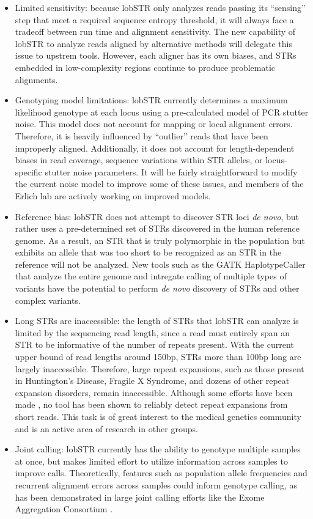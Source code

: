 \begin{itemize}
\item Limited sensitivity: because lobSTR only analyzes reads passing its ``sensing'' step that meet a required sequence entropy threshold, it will always face a tradeoff between run time and alignment sensitivity. The new capability of lobSTR to analyze reads aligned by alternative methods will delegate this issue to upstrem tools. However, each aligner has its own biases, and STRs embedded in low-complexity regions continue to produce problematic alignments.
\item Genotyping model limitations: lobSTR currently determines a maximum likelihood genotype at each locus using a pre-calculated model of PCR stutter noise. This model does not account for mapping or local alignment errors. Therefore, it is heavily influenced by ``outlier'' reads that have been improperly aligned. Additionally, it does not account for length-dependent biases in read coverage, sequence variations within STR alleles, or locus-specific stutter noise parameters. It will be fairly straightforward to modify the current noise model to improve some of these issues, and members of the Erlich lab are actively working on improved models.
\item Reference bias: lobSTR does not attempt to discover STR loci \emph{de novo}, but rather uses a pre-determined set of STRs discovered in the human reference genome. As a result, an STR that is truly polymorphic in the population but exhibits an allele that was too short to be recognized as an STR in the reference will not be analyzed. New tools such as the GATK HaplotypeCaller that analyze the entire genome and intregate calling of multiple types of variants have the potential to perform \emph{de novo} discovery of STRs and other complex variants.
\item Long STRs are inaccessible: the length of STRs that lobSTR can analyze is limited by the sequencing read length, since a read must entirely span an STR to be informative of the number of repeats present. With the current upper bound of read lengths around 150bp, STRs more than 100bp long are largely inaccessible. Therefore, large repeat expansions, such as those present in Huntington's Disease, Fragile X Syndrome, and dozens of other repeat expansion disorders, remain inaccessible. Although some efforts have been made \cite{DoiMonjoHoangEtAl2013}, no tool has been shown to reliably detect repeat expansions from short reads. This task is of great interest to the medical genetics community and is an active area of research in other groups.
\item Joint calling: lobSTR currently has the ability to genotype multiple samples at once, but makes limited effort to utilize information across samples to improve calls. Theoretically, features such as population allele frequencies and recurrent alignment errors across samples could inform genotype calling, as has been demonstrated in large joint calling efforts like the Exome Aggregation Consortium \cite{EXAC}.
\end{itemize}

